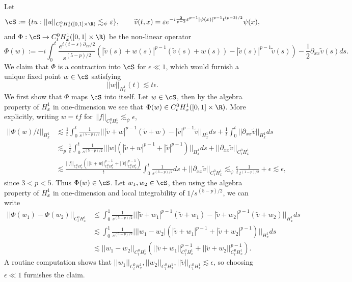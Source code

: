 \begin{solution}
	Let 
		\[ \cS := \{ tu : ||u||_{C^0_t H^1_x ([0, 1] \times \R)} \lesssim_\psi \epsilon \}, \qquad \widetilde v(t, x) = \epsilon e^{-i \frac{2}{p - 3} \epsilon^{p - 1} |\psi (x)|^{p - 1} t^{(p - 3)/2}} \psi(x), \]
	and $\Phi : \cS \to C^0_t H^1_x ([0, 1] \times \R)$ be the non-linear operator
		\[ \Phi (w) := -i \int_0^t \frac{e^{i (t - s) \partial_{xx}/2}}{s^{(5 - p)/2}} (|\widetilde v(s) + w(s)|^{p - 1} (\widetilde v(s) + w(s)) - |\widetilde v(s)|^{p - 1} \widetilde v(s)) - \frac12 \partial_{xx} \widetilde v (s) ds. \]	
	We claim that $\Phi$ is a contraction into $\cS$ for $\epsilon \ll 1$, which would furnish a unique fixed point $w \in \cS$ satisfying
		\[ ||w||_{H^1_x} (t) \lesssim t \epsilon. \]
	We first show that $\Phi$ maps $\cS$ into itself. Let $w \in \cS$, then by the algebra property of $H^1_x$ in one-dimension we see that $\Phi(w) \in C^0_t H^1_x ([0, 1] \times \R)$. More explicitly, writing $w = tf$ for $||f||_{C^0_t H^1_x} \lesssim_\psi \epsilon$, 
		\begin{align*}
			 ||\Phi(w)/t||_{H^1_x} 
			 	&\lesssim  \frac1t \int_0^t \frac{1}{s^{(5 - p)/2}} || |\widetilde v + w|^{p - 1} (\widetilde v + w) - |\widetilde v|^{p - 1} \widetilde v ||_{H^1_x} ds + \frac1t \int_0^t ||\partial_{xx} \widetilde v||_{H^1_x} ds\\
			 	&\lesssim_p \frac1t \int_0^t \frac{1}{s^{(5 - p)/2}} |||w| (|\widetilde v + w|^{p - 1} + |\widetilde v|^{p - 1})||_{H^1_x} ds +  ||\partial_{xx} \widetilde v||_{C^0_t H^1_x} \\
			 	&\lesssim \frac{||f||_{C^0_t H^1_x} (||\widetilde v + w||_{C^0_t H^1_x}^{p - 1} + ||\widetilde v ||^{p - 1}_{C^0_t H^1_x})}{t} \int_0^t \frac{1}{s^{(3 - p)/2}} ds + ||\partial_{xx} \widetilde v||_{C^0_t H^1_x} \lesssim_\psi \frac{\epsilon}{t} \frac{1}{t^{(1 - p)/2}} + \epsilon \lesssim \epsilon,
		\end{align*}	 
	since $3 < p < 5$. Thus $\Phi(w) \in \cS$. Let $w_1, w_2 \in \cS$, then using the algebra property of $H^1_x$ in one-dimension and local integrability of $1/s^{(5 - p)/2}$, we can write
		\begin{align*}
			||\Phi(w_1) - \Phi(w_2)||_{C^0_t H^1_x}
				&\leq \int_0^1 \frac{1}{s^{(5 - p)/2}} || |\widetilde v + w_1|^{p - 1} (\widetilde v + w_1) - |\widetilde v + w_2|^{p - 1} (\widetilde v + w_2) ||_{H^1_x} ds \\
				&\lesssim \int_0^1 \frac{1}{s^{(5 - p)/2}} || |w_1 - w_2| (|\widetilde v + w_1|^{p - 1} + |\widetilde v + w_2|^{p - 1}) ||_{H^1_x} ds \\
				&\lesssim ||w_1 - w_2||_{C^0_t H^1_x}  \left(||  \widetilde v + w_1||_{C^0_t H^1_x}^{p - 1} + ||\widetilde v + w_2 ||_{C^0_t H^1_x}^{p - 1}\right) .
		\end{align*}
	A routine computation shows that $||w_1||_{C^0_t H^1_x}, ||w_2||_{C^0_t H^1_x}, ||\widetilde v||_{C^0_t H^1_x} \lesssim \epsilon$, so choosing $\epsilon \ll 1$ furnishes the claim. 
\end{solution}


